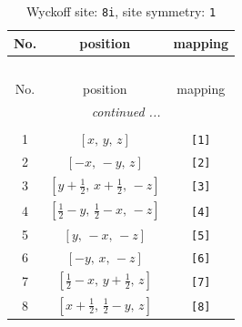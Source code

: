 \documentclass[fleqn,8pt]{jsarticle}
\begin{document}
\renewcommand{\arraystretch}{1.2}
\begin{longtable}{ccc}
\caption{Wyckoff site: {\tt 8i}, site symmetry: {\tt 1}}
 \\
 \hline \hline
No. & position & mapping \\ \hline \endfirsthead

\multicolumn{2}{l}{\tablename\ \thetable{}} \\
 \hline \hline
No. & position & mapping \\ \hline \endhead

 \hline \hline
\multicolumn{2}{r}{\footnotesize\it continued ...} \\ \endfoot

 \hline \hline
\multicolumn{2}{r}{} \\ \endlastfoot

1 & $\left[ x,\, y,\, z \right]$ & {\tt [1]} \\ \hline
2 & $\left[ - x,\, - y,\, z \right]$ & {\tt [2]} \\ \hline
3 & $\left[ y + \frac{1}{2},\, x + \frac{1}{2},\, - z \right]$ & {\tt [3]} \\ \hline
4 & $\left[ \frac{1}{2} - y,\, \frac{1}{2} - x,\, - z \right]$ & {\tt [4]} \\ \hline
5 & $\left[ y,\, - x,\, - z \right]$ & {\tt [5]} \\ \hline
6 & $\left[ - y,\, x,\, - z \right]$ & {\tt [6]} \\ \hline
7 & $\left[ \frac{1}{2} - x,\, y + \frac{1}{2},\, z \right]$ & {\tt [7]} \\ \hline
8 & $\left[ x + \frac{1}{2},\, \frac{1}{2} - y,\, z \right]$ & {\tt [8]} \\
\end{longtable}
\end{document}
